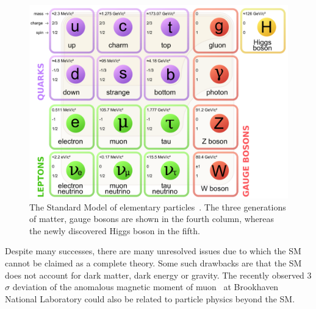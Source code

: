 \begin{singlespace}
\begin{figure}[h]
	\begin{center}
	\includegraphics[width=15.0cm]{figures/SMElementaryParticles}
	\end{center}
	\caption
	{The Standard Model of elementary particles~\cite{SM_figure}. The three generations of matter, gauge bosons are shown in the fourth column, whereas the newly discovered Higgs boson in the fifth.}
	\label{fig:SMElementaryParticles}
\end{figure}
\end{singlespace}

Despite many successes, there are many unresolved issues due to which the SM cannot be claimed as a complete theory. Some such drawbacks are that the SM does not account for dark matter, dark energy or gravity.
The recently observed 3$\sigma$ deviation of the anomalous magnetic moment of muon~\cite{PhysRevLett.92.161802} at Brookhaven National Laboratory could also be related to particle physics beyond the SM. 


